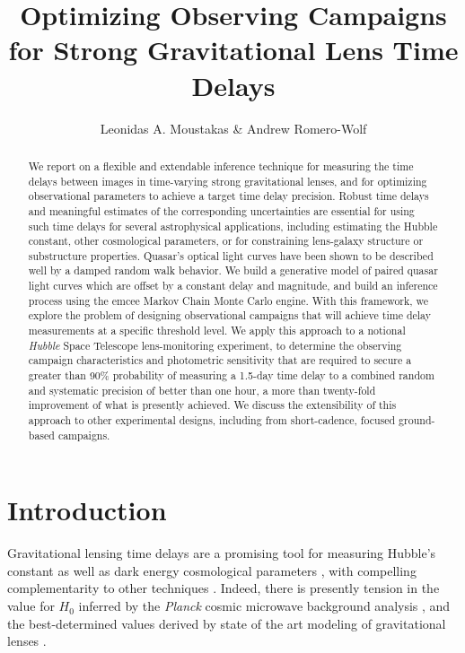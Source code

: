 \documentclass{emulateapj}
\begin{document}
\title{Optimizing Observing Campaigns for Strong  Gravitational Lens Time Delays} 
\author{Leonidas A. Moustakas \& Andrew Romero-Wolf} 

\begin{abstract}
  We report on a flexible and extendable inference technique for
  measuring the time delays between images in time-varying strong
  gravitational lenses, and for optimizing observational parameters to
  achieve a target time delay precision.  Robust time delays and
  meaningful estimates of the corresponding uncertainties are
  essential for using such time delays for several astrophysical
  applications, including estimating the Hubble constant, other
  cosmological parameters, or for constraining lens-galaxy structure
  or substructure properties. Quasar's optical light curves have been
  shown to be described well by a damped random walk behavior. We
  build a generative model of paired quasar light curves which are
  offset by a constant delay and magnitude, and build an inference
  process using the emcee Markov Chain Monte Carlo engine.  With this
  framework, we explore the problem of designing observational
  campaigns that will achieve time delay measurements at a specific
  threshold level.  We apply this approach to a notional \emph{Hubble}
  Space Telescope lens-monitoring experiment, to determine the
  observing campaign characteristics and photometric sensitivity that
  are required to secure a greater than 90\% probability of measuring
  a 1.5-day time delay to a combined random and systematic precision
  of better than one hour, a more than twenty-fold improvement of what
  is presently achieved.  We discuss the extensibility of this
  approach to other experimental designs, including from
  short-cadence, focused ground-based campaigns. 
\end{abstract}
 

\section{Introduction}

Gravitational lensing time delays are a promising tool for measuring
Hubble's constant \citep[$H_0$;][]{Refsdal1964a} as well as dark
energy cosmological parameters \citep{Coe2009b,Linder2011a,Treu2013a},
with compelling complementarity to other techniques
\citep{Weinberg2013a, Linder2015a}.  Indeed, there is presently
tension in the value for $H_0$ inferred by the \emph{Planck} cosmic
microwave background analysis \citep{Planck-Collaboration2014a,
  Planck-Collaboration2015a}, and the best-determined values derived
by state of the art modeling of gravitational lenses
\citep[e.g.][]{Suyu2013a, Suyu2014a}.
\end{document}
